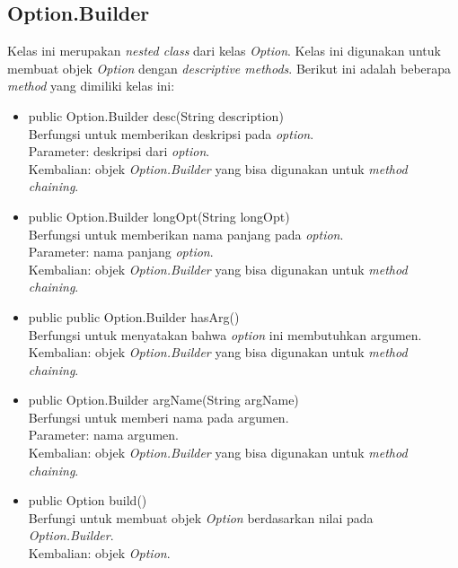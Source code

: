 \subsection{Option.Builder}
\label{subsec:optionbuilder}
Kelas ini merupakan \textit{nested class} dari kelas \textit{Option}. Kelas ini digunakan untuk membuat objek \textit{Option} dengan \textit{descriptive methods}. Berikut ini adalah beberapa \textit{method} yang dimiliki kelas ini: 
\begin{itemize}
\item public Option.Builder desc(String description)\\
Berfungsi untuk memberikan deskripsi pada \textit{option}.\\
Parameter: deskripsi dari \textit{option}.\\
Kembalian: objek \textit{Option.Builder} yang bisa digunakan untuk \textit{method chaining}.

\item public Option.Builder longOpt(String longOpt)\\
Berfungsi untuk memberikan nama panjang pada \textit{option}.\\
Parameter: nama panjang \textit{option}.\\
Kembalian: objek \textit{Option.Builder} yang bisa digunakan untuk \textit{method chaining}.

\item public public Option.Builder hasArg()\\
Berfungsi untuk menyatakan bahwa \textit{option} ini membutuhkan argumen.\\
Kembalian: objek \textit{Option.Builder} yang bisa digunakan untuk \textit{method chaining}.

\item public Option.Builder argName(String argName)\\
Berfungsi untuk memberi nama pada argumen.\\
Parameter: nama argumen.\\
Kembalian: objek \textit{Option.Builder} yang bisa digunakan untuk \textit{method chaining}.

\item public Option build()\\
Berfungi untuk membuat objek \textit{Option} berdasarkan nilai pada \textit{Option.Builder}.\\
Kembalian: objek \textit{Option}.

\end{itemize}


